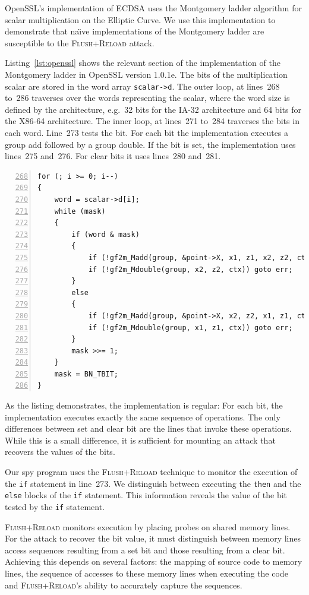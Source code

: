 \documentclass[twocolumn]{svjour3}
\begin{document}
OpenSSL's implementation of ECDSA uses the Montgomery ladder algorithm for scalar multiplication
on the Elliptic Curve.
We use this implementation to demonstrate that na{\"\i}ve implementations of the Montgomery ladder are
susceptible to the \textsc{Flush+Reload} attack.

Listing~\ref{lst:openssl} shows the relevant section of the implementation of the Montgomery ladder in OpenSSL version 1.0.1e.
The bits of the multiplication scalar are stored in the word array \texttt{scalar->d}.
The outer loop, at lines~268 to~286 traverses over the words representing the scalar,
where the word size is defined by the architecture, e.g.\ 32 bits for the IA-32 architecture and 64 bits for the X86-64 architecture.
The inner loop, at lines~271 to~284 traverses the bits in each word.
Line~273 tests the bit. 
For each bit the implementation executes a group add followed by a group double.
If the bit is set, the implementation uses lines~275 and~276.
For clear bits it uses lines~280 and~281.

\begin{lstlisting}[numbers=left,firstnumber=268,float=htb,caption=OpenSSL implementation of the Montgomery ladder,label=lst:openssl]
for (; i >= 0; i--)
{
    word = scalar->d[i];
    while (mask)
    {
        if (word & mask)
        {
            if (!gf2m_Madd(group, &point->X, x1, z1, x2, z2, ctx)) goto err;
            if (!gf2m_Mdouble(group, x2, z2, ctx)) goto err;
        }
        else
        {
            if (!gf2m_Madd(group, &point->X, x2, z2, x1, z1, ctx)) goto err;
            if (!gf2m_Mdouble(group, x1, z1, ctx)) goto err;
        }
        mask >>= 1;
    }
    mask = BN_TBIT;
}
\end{lstlisting}

As the listing demonstrates, the implementation is regular: For each bit, the implementation executes exactly the same sequence of operations.
The only differences between set and clear bit are the lines that invoke these operations.
While this is a small difference, it is sufficient for mounting an attack that recovers 
the values of the bits.


Our spy program uses the \textsc{Flush+Reload} technique to monitor the execution of the \texttt{if}
statement in line~273.
We distinguish between executing the \texttt{then} and the \texttt{else} blocks of the \texttt{if}
statement.
This information reveals the value of the bit tested by the \texttt{if} statement.

\textsc{Flush+Reload} monitors execution by placing probes on shared memory lines.
For the attack to recover the bit value, it must distinguish between memory lines access sequences
resulting from a set bit and those resulting from a clear bit.
Achieving this depends on several factors: the mapping of source code to memory lines, 
the sequence of accesses to these memory lines when executing the code and 
\textsc{Flush+Reload}'s ability to accurately capture the sequences.
\end{document}
